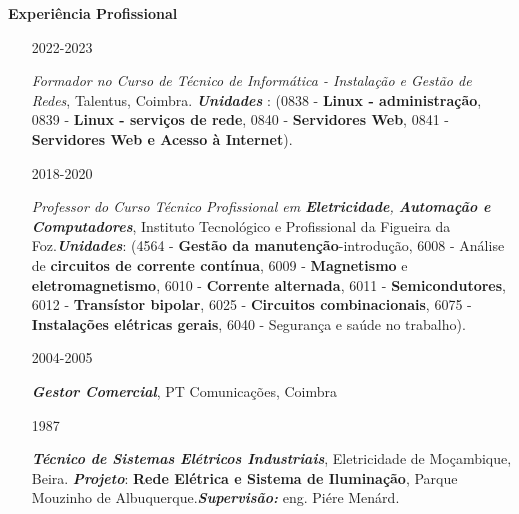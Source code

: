\documentclass[10pt,a4paper,oneside]{article}
\newlength{\datewidth}
\newlength{\textindent}
\begin{document}
	\vspace{5mm}
	\textbf{\hspace{\textindent}Experiência Profissional}
	\begin{itemize}
		\item[\hspace{\datewidth}\scriptsize 2022-2023] \parbox[t]{\dimexpr\linewidth-\datewidth-\textindent}{\textit{Formador no Curso de Técnico de Informática - Instalação e Gestão de Redes}, Talentus, Coimbra. \textbf{\textit{Unidades }}: (0838 - \textbf{Linux - administração}, 0839 - \textbf{Linux - serviços de rede}, 0840 - \textbf{Servidores Web}, 0841 - \textbf{Servidores Web e Acesso à Internet}).}
		\item[\hspace{\datewidth}\scriptsize 2018-2020] \parbox[t]{\dimexpr\linewidth-\datewidth-\textindent}{\textit{Professor do Curso Técnico Profissional em \textbf{Eletricidade}, \textbf{Automação e Computadores}}, Instituto Tecnológico e Profissional da Figueira da Foz.\textbf{\textit{Unidades}}: (4564 - \textbf{Gestão da manutenção}-introdução, 6008 - Análise de \textbf{circuitos de corrente contínua}, 6009 - \textbf{Magnetismo} e \textbf{eletromagnetismo}, 6010 - \textbf{Corrente alternada}, 6011 - \textbf{Semicondutores}, 6012 - \textbf{Transístor bipolar}, 6025 - \textbf{Circuitos combinacionais}, 6075 - \textbf{Instalações elétricas gerais}, 6040 - Segurança e saúde no trabalho).}
		\item[\hspace{\datewidth}\scriptsize 2004-2005] \parbox[t]{\dimexpr\linewidth-\datewidth-\textindent}{\textit{\textbf{Gestor Comercial}}, PT Comunicações, Coimbra}
		\item[\hspace{\datewidth}\scriptsize 1987] \parbox[t]{\dimexpr\linewidth-\datewidth-\textindent}{\textit{\textbf{Técnico de Sistemas Elétricos Industriais}}, Eletricidade de Moçambique, Beira. \textbf{\textit{Projeto}}: \textbf{Rede Elétrica e Sistema de Iluminação}, Parque Mouzinho de Albuquerque.\textbf{\textit{Supervisão:}} eng. Piére Menárd.}
	\end{itemize}
	
\end{document}
